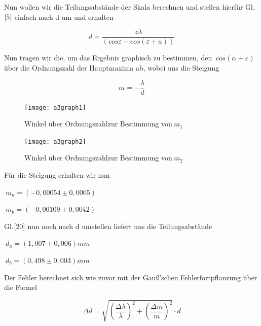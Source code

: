 \documentclass{article}
\begin{document}
Nun wollen wir die Teilungsabstände der Skala berechnen und stellen hierfür Gl.\(\eqref{5}\) einfach nach d um und erhalten

\begin{equation}
\label{6}
d = \frac {z \lambda}{ ( cos \varepsilon - cos( \varepsilon + a))}
\end{equation}

\newpage

Nun tragen wir die, um das Ergebnis graphisch zu bestimmen, den \(\ cos(\alpha + \varepsilon ) \) über die Ordnungszahl der Hauptmaxima ab, wobei uns die Steigung 


\begin{equation}
\label{20}
m= - \frac{\lambda }{d}
\end{equation}

\begin{figure}[htbp]
\centering
\texttt{[image: a3graph1]}
\begin{center}
\caption{Winkel über Ordnungszahlzur Bestimmung von\(\ m_{1} \)}
\end{center}

\centering
\texttt{[image: a3graph2]}
\begin{center}
\caption{Winkel über Ordnungszahlzur Bestimmung von\(\ m_{2} \)}
\end{center}
\end{figure}

\newpage

Für die Steigung erhalten wir nun

\begin{center}
\(\ m_{a}=(-0,00054 \pm 0,0005) \)
\end{center}

\begin{center}
\(\ m_{b}=(-0,00109 \pm 0,0042) \)
\end{center}

 Gl.\(\eqref{20}\) nun noch nach d umstellen liefert uns die Teilungsabstände

\begin{center}
\(\ d_{a}=(1,007 \pm 0,006)mm \)
\end{center}

\begin{center}
\(\ d_{b}=(0,498 \pm 0,003)mm \)
\end{center}

Der Fehler berechnet sich wie zuvor mit der Gauß'schen Fehlerfortpflanzung über die Formel

\begin{equation}
\Delta d= \sqrt{\left ( \frac{ \Delta \lambda}{\lambda} \right )^2+\left (\frac {\Delta m}{m} \right )^2} \cdot d
\end{equation}
\end{document}
